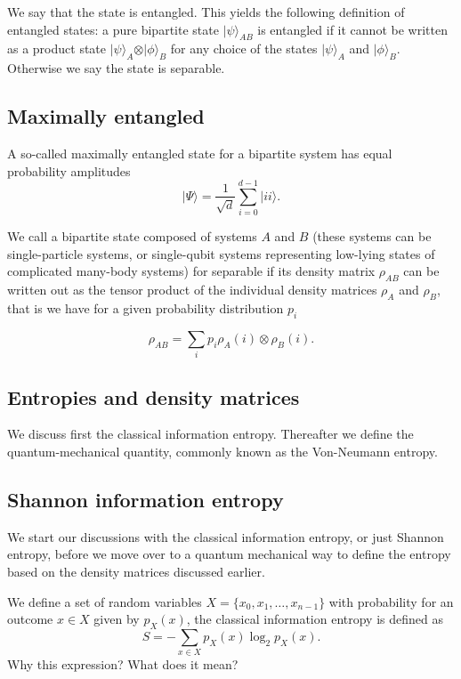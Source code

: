 \documentclass[%
oneside,                 %
final,                   %
10pt]{article}
\begin{document}
We say that the state is entangled. This yields the following
definition of entangled states: a pure bipartite state $\vert
\psi\rangle_{AB}$ is entangled if it cannot be written as a product
state $\vert\psi\rangle_{A}\otimes\vert\phi\rangle_B$ for any choice
of the states $\vert\psi\rangle_{A}$ and $\vert\phi\rangle_B$. Otherwise we say the state is separable.

\subsection{Maximally entangled}

A so-called maximally entangled state for a bipartite system has equal  probability amplitudes
\[
\vert \Psi \rangle = \frac{1}{\sqrt{d}}\sum_{i=0}^{d-1}\vert ii\rangle.
\]

We call a bipartite state composed of systems $A$ and $B$ (these
systems can be single-particle systems, or single-qubit systems
representing low-lying states of complicated many-body systems) for
separable if its density matrix $\rho_{AB}$ can be written out as the
tensor product of the individual density matrices $\rho_A$ and
$\rho_B$, that is we have for a given probability distribution $p_i$

\[
\rho_{AB}=\sum_ip_i\rho_A(i)\otimes \rho_B(i).
\]

\subsection{Entropies and density matrices}

We discuss first the classical information entropy.
Thereafter we define the quantum-mechanical quantity, commonly known as the Von-Neumann entropy.

\subsection{Shannon information entropy}

We start our discussions with the classical information entropy, or
just Shannon entropy, before we move over to a quantum mechanical way
to define the entropy based on the density matrices discussed earlier.

We define a set of random variables $X=\{x_0,x_1,\dots,x_{n-1}\}$ with probability for an outcome $x\in X$ given by $p_X(x)$, the
classical information entropy is defined as
\[
S=-\sum_{x\in X}p_X(x)\log_2{p_X(x)}.
\]
Why this expression? What does it mean?
\end{document}
